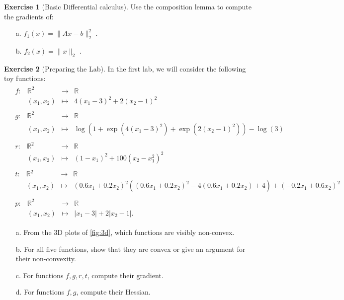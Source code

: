 \documentclass[a4paper,twoside,10pt]{amsart}
\numberwithin{equation}{section} %
\numberwithin{figure}{section} %
\numberwithin{table}{section} %
\theoremstyle{definition}
\newtheorem{q_td}{Exercise }
\begin{document}
\vspace*{0.5cm}

\begin{q_td}[Basic Differential calculus]
\label{td:conv}
Use the composition lemma to compute the gradients of:
\begin{itemize}
\item[a.] $f_1(x) = \|Ax-b\|_2^2$  .
\item[b.] $f_2(x) = \|x\|_2$ .
\end{itemize}
\end{q_td}


\vspace*{0.5cm}

\begin{q_td}[Preparing the Lab]
\label{td:fun}
In the first lab, we will consider the following toy functions:
\begin{align*}
& \begin{array}{rrcll}
f: & \mathbb{R}^2 & \to &\mathbb{R}\\
& (x_1,x_2) & \mapsto  & 4 (x_1-3)^2 + 2(x_2-1)^2
\end{array}\\
%
& \begin{array}{rrcll}
g: & \mathbb{R}^2 & \to &\mathbb{R}\\
& (x_1,x_2) & \mapsto  & \log( 1 + \exp(4 (x_1-3)^2 ) + \exp( 2(x_2-1)^2 ) ) - \log(3)
\end{array} \\
%
& \begin{array}{rrcll}
r: & \mathbb{R}^2 & \to &\mathbb{R}\\
& (x_1,x_2) & \mapsto  &  (1-x_1)^2 + 100(x_2-x_1^2)^2
\end{array}\\
%
& \begin{array}{rrcll}
t: & \mathbb{R}^2 & \to &\mathbb{R}\\
& (x_1,x_2) & \mapsto  & (0.6 x_1 + 0.2 x_2)^2 \left((0.6 x_1 + 0.2 x_2)^2 - 4 (0.6 x_1 + 0.2 x_2)+4\right) + (-0.2 x_1 + 0.6 x_2)^2
\end{array}\\
%
& \begin{array}{rrcll}
p: & \mathbb{R}^2 & \to &\mathbb{R}\\
& (x_1,x_2) & \mapsto  &  \left| x_1-3 \right|  + 2\left| x_2-1\right| .
\end{array}
\end{align*}
\begin{itemize}
\item[a.] From the 3D plots of \ref{fig:3d}, which functions are visibly non-convex.
\item[b.] For all five functions, show that they are convex or give an argument for their non-convexity.
\item[c.] For functions $f,g,r,t$, compute their gradient.
\item[d.] For functions $f,g$, compute their Hessian.
\end{itemize}
\end{q_td}
\end{document}
